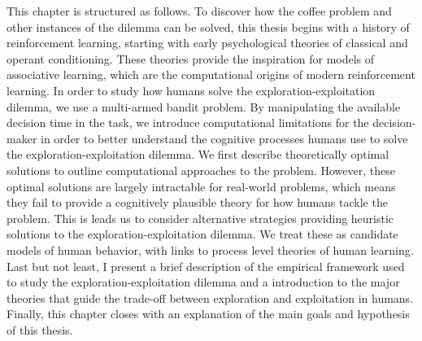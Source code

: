  
This chapter is structured as follows. %
To discover how the coffee problem and other instances of the dilemma can be solved, this thesis begins with a history of reinforcement learning, starting with early psychological theories of classical and operant conditioning. %
These theories provide the inspiration for models of associative learning, which are the computational origins of modern reinforcement learning. %
In order to study how humans solve the exploration-exploitation dilemma, we use a multi-armed bandit problem. %
By manipulating the available decision time in the task, we introduce computational limitations for the decision-maker in order to better understand the cognitive processes humans use to solve the exploration-exploitation dilemma. %
We first describe theoretically optimal solutions to outline computational approaches to the problem. However, these optimal solutions are largely intractable for real-world problems, which means they fail to provide a cognitively plausible theory for how humans tackle the problem. 
This is leads us to consider alternative strategies providing heuristic solutions to the exploration-exploitation dilemma. We treat these as candidate models of human behavior, with links to process level theories of human learning. %
Last but not least, I present a brief description of the empirical framework used to study the exploration-exploitation dilemma and a introduction to the major theories that guide the trade-off between exploration and exploitation in humans. 
Finally, this chapter closes with an explanation of the main goals and hypothesis of this thesis. 

